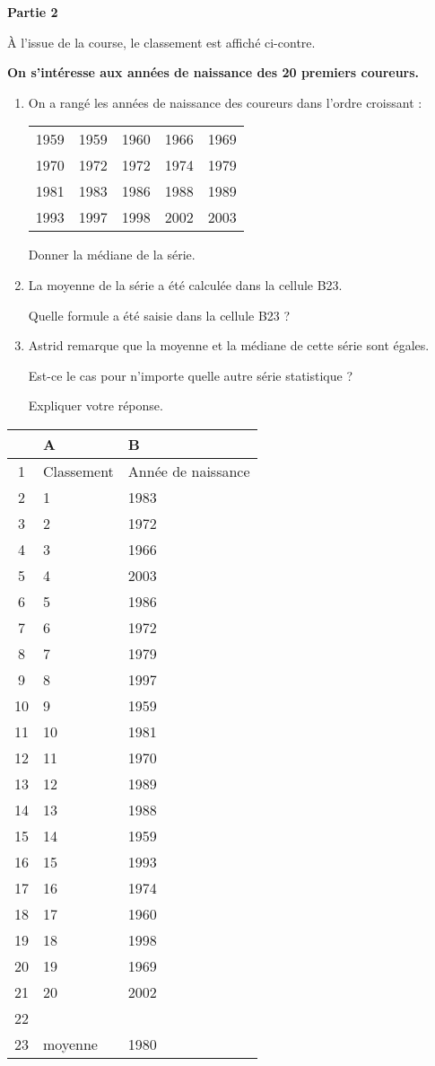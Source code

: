 \parbox{0.55\linewidth}{\textbf{Partie 2}

À l'issue de la course, le classement est affiché ci-contre.

\textbf{On s'intéresse aux années de naissance des 20 premiers coureurs.}

\medskip

\begin{enumerate}
\item On a rangé les années de naissance des coureurs dans l'ordre croissant :

\begin{tabularx}{\linewidth}{*{5}{X}}
1959&1959&1960&1966&1969\\
1970&1972&1972&1974&1979\\
1981&1983&1986&1988&1989\\
1993&1997&1998&2002&2003\\
\end{tabularx}

Donner la médiane de la série.
\item La moyenne de la série a été calculée dans la cellule B23.

Quelle formule a été saisie dans la cellule B23 ?
\item Astrid remarque que la moyenne et la médiane de cette série sont égales.

Est-ce le cas pour n'importe quelle autre série statistique ?

Expliquer votre réponse.
\end{enumerate}} \hfill
\parbox{0.43\linewidth}{\begin{tabularx}{\linewidth}{|c|*{2}{X|}}\hline
 	&A 			&B\\ \hline
1 	&\footnotesize Classement &\footnotesize Année de naissance\\ \hline
2 	&1 			&1983\\ \hline
3 	&2 			&1972\\ \hline
4 	&3 			&1966\\ \hline
5 	&4 			&2003\\ \hline
6 	&5 			&1986\\ \hline
7 	&6 			&1972\\ \hline
8 	&7 			&1979\\ \hline
9 	&8 			&1997\\ \hline
10 	&9 			&1959\\ \hline
11 	&10 		&1981\\ \hline
12 	&11 		&1970\\ \hline
13 	&12 		&1989\\ \hline
14 	&13 		&1988\\ \hline
15 	&14 		&1959\\ \hline
16 	&15 		&1993\\ \hline
17 	&16 		&1974\\ \hline
18 	&17 		&1960\\ \hline
19 	&18 		&1998\\ \hline
20 	&19 		&1969\\ \hline
21 	&20 		&2002\\ \hline
22	&			&\\ \hline
23 &moyenne		& 1980\\ \hline
\end{tabularx}}

\vspace{0,5cm}

